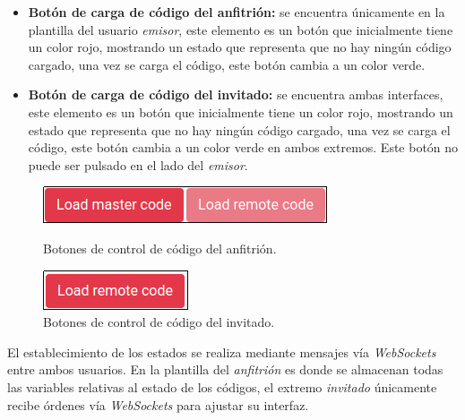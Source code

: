 \documentclass[a4paper, 12pt]{book}
\begin{document}
\begin{itemize}
\item \textbf{Botón de carga de código del anfitrión:} se encuentra únicamente en la plantilla del usuario \emph{emisor}, este elemento es un botón que inicialmente tiene un color rojo, mostrando un estado que representa que no hay ningún código cargado, una vez se carga el código, este botón cambia a un color verde.
\item \textbf{Botón de carga de código del invitado:} se encuentra ambas interfaces, este elemento es un botón que inicialmente tiene un color rojo, mostrando un estado que representa que no hay ningún código cargado, una vez se carga el código, este botón cambia a un color verde en ambos extremos. Este botón no puede ser pulsado en el lado del \emph{emisor}.
\end{itemize}

\begin{figure}[H]
  \centering
  \begin{minipage}[b]{0.4\textwidth}
    \includegraphics[width=\textwidth]{img/host_code_buttons.png}
    \caption{Botones de control de código del anfitrión.}
    \label{figura:robot_davinci}
  \end{minipage}
  \hfill
  \begin{minipage}[b]{0.4\textwidth}
    \includegraphics[width=\textwidth]{img/guest_code_buttons.png}
    \caption{Botones de control de código del invitado.}
    \label{figura:robot_atrias}
  \end{minipage}
\end{figure}

El establecimiento de los estados se realiza mediante mensajes vía \emph{WebSockets} entre ambos usuarios. En la plantilla del \emph{anfitrión} es donde se almacenan todas las variables relativas al estado de los códigos, el extremo \emph{invitado} únicamente recibe órdenes vía \emph{WebSockets} para ajustar su interfaz.
\end{document}
